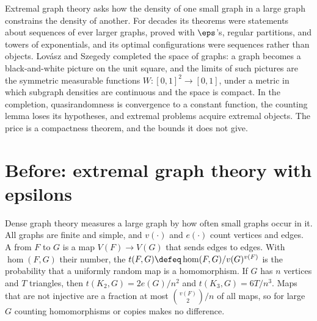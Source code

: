 \begin{refsection}

\newcommand{\graphoncut}[1]{\norm{#1}_{\square}}
\newcommand{\graphondelta}{\delta_{\square}}
\newcommand{\graphonhom}{\operatorname{hom}}
\newcommand{\graphonspace}{\widetilde{\cW}_0}

\begin{chaptersummary}
Extremal graph theory asks how the density of one small graph in a large graph constrains the density of another. For decades its theorems were statements about sequences of ever larger graphs, proved with $\eps$'s, regular partitions, and towers of exponentials, and its optimal configurations were sequences rather than objects. Lov\'asz and Szegedy completed the space of graphs: a graph becomes a black-and-white picture on the unit square, and the limits of such pictures are the symmetric measurable functions $W\colon[0,1]^2\to[0,1]$, under a metric in which subgraph densities are continuous and the space is compact. In the completion, quasirandomness is convergence to a constant function, the counting lemma loses its hypotheses, and extremal problems acquire extremal objects. The price is a compactness theorem, and the bounds it does not give.
\end{chaptersummary}

\section{Before: extremal graph theory with epsilons}\label{sec:graphon:before}

Dense graph theory measures a large graph by how often small graphs occur in it. All graphs are finite and simple, and $v(\cdot)$ and $e(\cdot)$ count vertices and edges. A  from $F$ to $G$ is a map $V(F)\to V(G)$ that sends edges to edges. With $\graphonhom(F,G)$ their number, the  $t(F,G)\defeq\graphonhom(F,G)/v(G)^{v(F)}$ is the probability that a uniformly random map is a homomorphism. If $G$ has $n$ vertices and $T$ triangles, then $t(K_2,G)=2e(G)/n^2$ and $t(K_3,G)=6T/n^3$. Maps that are not injective are a fraction at most $\binom{v(F)}{2}/n$ of all maps, so for large $G$ counting homomorphisms or copies makes no difference.


\end{refsection}
